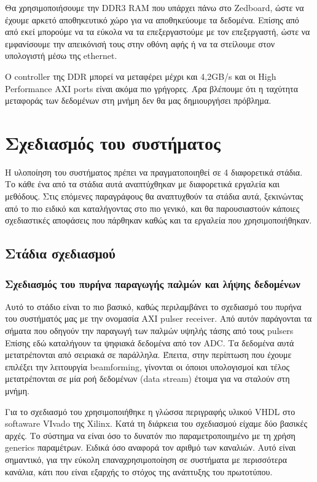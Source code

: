\documentclass[12pt,a4paper]{book}
\begin{document}
Θα χρησιμοποιήσουμε την DDR3 RAM που υπάρχει πάνω στο Zedboard, ώστε να έχουμε αρκετό αποθηκευτικό χώρο για να αποθηκεύουμε τα δεδομένα. Επίσης από από εκεί μπορούμε να τα εύκολα να τα επεξεργαστούμε με τον επεξεργαστή, ώστε να εμφανίσουμε την απεικόνισή τους στην οθόνη αφής ή να τα στείλουμε στον υπολογιστή μέσω της ethernet. 

Ο controller της DDR μπορεί να μεταφέρει μέχρι και 4,2GB/s και οι High Performance AXI ports είναι ακόμα πιο γρήγορες. Άρα βλέπουμε ότι η ταχύτητα μεταφοράς των δεδομένων στη μνήμη δεν θα μας δημιουργήσει πρόβλημα.


\chapter{Σχεδιασμός του συστήματος}
Η υλοποίηση του συστήματος πρέπει να πραγματοποιηθεί σε 4 διαφορετικά στάδια. Το κάθε ένα από τα στάδια αυτά αναπτύχθηκαν με διαφορετικά εργαλεία και μεθόδους. Στις επόμενες παραγράφους θα αναπτυχθούν τα στάδια αυτά, ξεκινώντας από το πιο ειδικό και καταλήγοντας στο πιο γενικό, και θα παρουσιαστούν κάποιες σχεδιαστικές αποφάσεις που πάρθηκαν καθώς και τα εργαλεία που χρησιμοποιήθηκαν. 

\section{Στάδια σχεδιασμού}
\subsection{Σχεδιασμός του πυρήνα παραγωγής παλμών και λήψης δεδομένων}
Αυτό το στάδιο είναι το πιο βασικό, καθώς περιλαμβάνει το σχεδιασμό του πυρήνα του συστήματός μας με την ονομασία AXI pulser receiver. Από αυτόν παράγονται τα σήματα που οδηγούν την παραγωγή των παλμών υψηλής τάσης από τους pulsers Επίσης εδώ καταλήγουν τα ψηφιακά δεδομένα από τον ADC. Τα δεδομένα αυτά μετατρέπονται από σειριακά σε παράλληλα. Έπειτα, στην περίπτωση που έχουμε επιλέξει την λειτουργία beamforming, γίνονται οι όποιοι υπολογισμοί και τέλος μετατρέπονται σε μία ροή δεδομένων (data stream) έτοιμα για να σταλούν στη μνήμη.

Για το σχεδιασμό του χρησιμοποιήθηκε η γλώσσα περιγραφής υλικού VHDL στο softaware VIvado της Xilinx. Κατά τη διάρκεια του σχεδιασμού είχαμε δύο βασικές αρχές. Το σύστημα να είναι όσο το δυνατόν πιο παραμετροποιημένο με τη χρήση generics παραμέτρων. Ειδικά όσο αναφορά τον αριθμό των καναλιών. Αυτό είναι σημαντικό, για την εύκολη επαναχρησιμοποίηση σε συστήματα με περισσότερα κανάλια, κάτι που είναι εξαρχής το στόχος της ανάπτυξης του πρωτοτύπου. 
\end{document}
